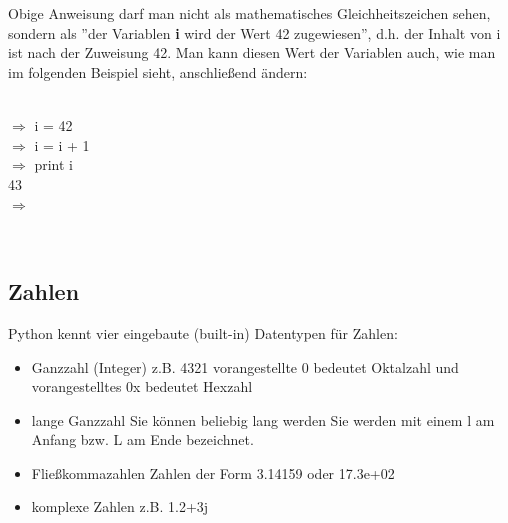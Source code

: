 \\ \\
Obige Anweisung darf man nicht als mathematisches Gleichheitszeichen sehen, sondern als ''der Variablen \textbf{i} wird der Wert 42 zugewiesen'', d.h. der Inhalt von i ist nach der Zuweisung 42. Man kann diesen Wert der Variablen auch, wie man im folgenden Beispiel sieht, anschließend ändern:  \\
\\
\begin{MyConsoleBox}{
${\Longrightarrow}$ i = 42 \\
${\Longrightarrow}$ i = i + 1 \\
${\Longrightarrow}$ print i \\
43 \\
${\Longrightarrow}$ \\
}\end{MyConsoleBox}
\\
\subsection{Zahlen}
Python kennt vier eingebaute (built-in) Datentypen für Zahlen:\\
\begin{itemize}
\item Ganzzahl (Integer) z.B. 4321
vorangestellte 0 bedeutet Oktalzahl und
vorangestelltes 0x bedeutet Hexzahl
\item lange Ganzzahl
Sie können beliebig lang werden
Sie werden mit einem l am Anfang bzw. L am Ende bezeichnet.
\item Fließkommazahlen
Zahlen der Form 3.14159 oder 17.3e+02
\item komplexe Zahlen
z.B. 1.2+3j
\end{itemize}

